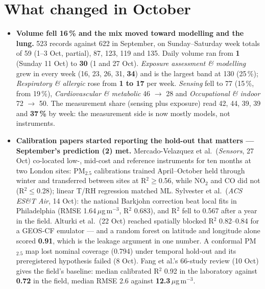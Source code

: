 \documentclass[10pt]{article}
\begin{document}
\vspace{3mm}

\section*{\sffamily\bfseries\color{Deep}What changed in October}
\vspace{-1.5mm}{\color{Coral}\rule{\linewidth}{1.1pt}}\vspace{2.5mm}

\footnotesize
\begin{itemize}
\item \textbf{Volume fell 16\,\% and the mix moved toward modelling and the lung.} 523 records against 622
in September, on Sunday--Saturday week totals of 59 (1--3 Oct, partial), 87, 123, 119 and 135. Daily volume
ran from \textbf{1} (Sunday 11 Oct) to \textbf{30} (1 and 27 Oct). \textit{Exposure assessment \&
modelling} grew in every week (16, 23, 26, 31, \textbf{34}) and is the largest band at 130 (25\,\%);
\textit{Respiratory \& allergic} rose from \textbf{1 to 17} per week. \textit{Sensing} fell to 77 (15\,\%,
from 19\,\%), \textit{Cardiovascular \& metabolic} 46 $\rightarrow$ 28 and \textit{Occupational \& indoor}
72 $\rightarrow$ 50. The measurement share (sensing plus exposure) read 42, 44, 39, 39 and \textbf{37\,\%}
by week: the measurement side is now mostly models, not instruments.

\item \textbf{Calibration papers started reporting the hold-out that matters --- September's prediction
(2) met.} Mercado-Velazquez et al.\ (\textit{Sensors}, 27 Oct) co-located low-, mid-cost and reference
instruments for ten months at two London sites: PM$_{2.5}$ calibrations trained April--October held
through winter and transferred between sites at R$^2\geq$0.56, while NO$_2$ and CO did not (R$^2\leq$0.28);
linear T/RH regression matched ML. Sylvester et al.\ (\textit{ACS ES\&T Air}, 14 Oct): the national
Barkjohn correction beat local fits in Philadelphia (RMSE 1.64\,$\mu$g\,m$^{-3}$, R$^2$ 0.683), and R$^2$
fell to 0.567 after a year in the field. Alturki et al.\ (22 Oct) reached spatially blocked R$^2$
0.82--0.84 for a GEOS-CF emulator --- and a random forest on latitude and longitude alone scored
\textbf{0.91}, which is the leakage argument in one number. A conformal PM$_{2.5}$ map lost nominal
coverage (0.794) under temporal hold-out and its preregistered hypothesis failed (8 Oct). Fang et al.'s
66-study review (10 Oct) gives the field's baseline: median calibrated R$^2$ 0.92 in the laboratory
against \textbf{0.72} in the field, median RMSE 2.6 against \textbf{12.3}\,$\mu$g\,m$^{-3}$.


\end{itemize}
\end{document}
